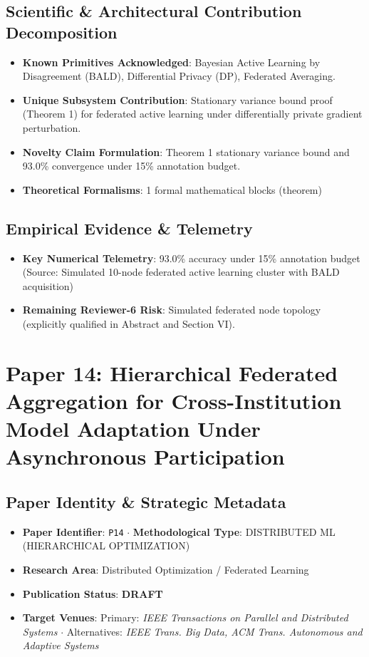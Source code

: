 \documentclass[11pt,a4paper]{article}
\begin{document}
\subsection*{Scientific & Architectural Contribution Decomposition}
\begin{itemize}[leftmargin=1.5em, itemsep=0.2em]
    \item \textbf{Known Primitives Acknowledged}: Bayesian Active Learning by Disagreement (BALD), Differential Privacy (DP), Federated Averaging.
    \item \textbf{Unique Subsystem Contribution}: Stationary variance bound proof (Theorem 1) for federated active learning under differentially private gradient perturbation.
    \item \textbf{Novelty Claim Formulation}: Theorem 1 stationary variance bound and 93.0\% convergence under 15\% annotation budget.
    \item \textbf{Theoretical Formalisms}: 1 formal mathematical blocks (theorem)
\end{itemize}

\subsection*{Empirical Evidence & Telemetry}
\begin{itemize}[leftmargin=1.5em, itemsep=0.2em]
    \item \textbf{Key Numerical Telemetry}: 93.0\% accuracy under 15\% annotation budget (Source: Simulated 10-node federated active learning cluster with BALD acquisition)
    \item \textbf{Remaining Reviewer-6 Risk}: Simulated federated node topology (explicitly qualified in Abstract and Section VI).
\end{itemize}

\section{Paper 14: Hierarchical Federated Aggregation for Cross-Institution Model Adaptation Under Asynchronous Participation}

\subsection*{Paper Identity \& Strategic Metadata}
\begin{itemize}[leftmargin=1.5em, itemsep=0.2em]
    \item \textbf{Paper Identifier}: \texttt{P14} $\cdot$ \textbf{Methodological Type}: DISTRIBUTED ML (HIERARCHICAL OPTIMIZATION)
    \item \textbf{Research Area}: Distributed Optimization / Federated Learning
    \item \textbf{Publication Status}: \textbf{DRAFT}
    \item \textbf{Target Venues}: Primary: \textit{IEEE Transactions on Parallel and Distributed Systems} $\cdot$ Alternatives: \textit{IEEE Trans. Big Data, ACM Trans. Autonomous and Adaptive Systems}
\end{itemize}
\end{document}
